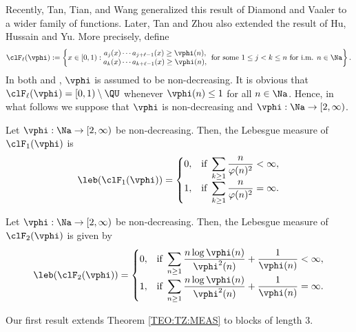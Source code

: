 \documentclass[12pt,a4paper]{amsart}
\begin{document}
Recently, Tan, Tian, and Wang \cite{TanTianWang2023} generalized this result of Diamond and Vaaler to a wider family of functions. Later, Tan and Zhou \cite{TanZhou2024} also extended the result of Hu, Hussain and Yu. More precisely, define 
\[
\clF_{\ell}(\vphi)
:=
\left\{ x\in [0,1):
\begin{matrix}
a_{j}(x)\cdots a_{j+\ell-1}(x) \geq \vphi(n), \\
a_{k}(x)\cdots a_{k+\ell-1}(x) \geq \vphi(n),
\end{matrix}\;
\text{ for some } 1\leq j < k \leq n \text{ for i.m.   } n\in\Na\right\}.
\]
In both \cite{TanTianWang2023} and \cite{TanZhou2024}, $\vphi$ is assumed to be non-decreasing. It is obvious that $\clF_{\ell}(\vphi)=[0,1)\setminus \QU$ whenever $\vphi(n)\leq 1$ for all $n\in \Na$. Hence, in what follows we suppose that $\vphi$ is non-decreasing and $\vphi:\Na\to[2,\infty)$.
 
\begin{teo01}\label{TEO:TTW:MEAS} Let  $\vphi:\Na\to[2,\infty)$ be non-decreasing. Then, the Lebesgue measure of $\clF_1(\vphi)$ is 
    \[
    \leb(\clF_1(\vphi))
    =
    \begin{cases}
        0, &\text{\rm if }  \displaystyle\sum_{k\geq 1} \frac{n}{\varphi(n)^2}<\infty,\\
        1, &\text{\rm if }  \displaystyle\sum_{k\geq 1} \frac{n}{\varphi(n)^2}=\infty.
    \end{cases}
    \]
\end{teo01}

\begin{teo01}\label{TEO:TZ:MEAS}
 Let  $\vphi:\Na\to[2,\infty)$ be non-decreasing. Then, the Lebesgue measure of $ \clF_2(\vphi)$ is given by
\[
\leb(\clF_2(\vphi))
=
\begin{cases}
0, &\text{\rm if } \displaystyle\sum_{n\geq 1} 
\frac{n\log  \vphi(n)}{\vphi^2(n)} + \frac{1}{\vphi(n)} <\infty, \\   1, &\text{\rm if } \displaystyle\sum_{n\geq 1} 
\frac{n\log  \vphi(n)}{\vphi^2(n)} + \frac{1}{\vphi(n)} =\infty.
\end{cases}
\]
\end{teo01}
Our first result extends Theorem \ref{TEO:TZ:MEAS} to blocks of length $3$.
\end{document}

